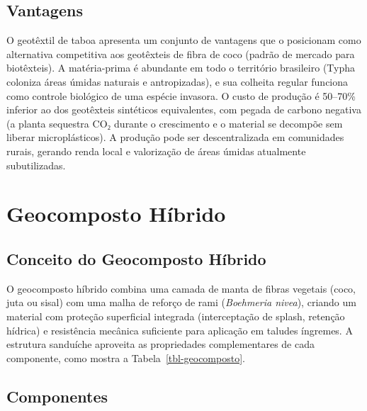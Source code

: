 \documentclass[
  portuguese,
  11pt,
  a4paper,
  open=any]{scrbook}
\begin{document}
\subsection{Vantagens}\label{vantagens}

O geotêxtil de taboa apresenta um conjunto de vantagens que o posicionam
como alternativa competitiva aos geotêxteis de fibra de coco (padrão de
mercado para biotêxteis). A matéria-prima é abundante em todo o
território brasileiro (Typha coloniza áreas úmidas naturais e
antropizadas), e sua colheita regular funciona como controle biológico
de uma espécie invasora. O custo de produção é 50--70\% inferior ao dos
geotêxteis sintéticos equivalentes, com pegada de carbono negativa (a
planta sequestra CO₂ durante o crescimento e o material se decompõe sem
liberar microplásticos). A produção pode ser descentralizada em
comunidades rurais, gerando renda local e valorização de áreas úmidas
atualmente subutilizadas.

\section{Geocomposto Híbrido}\label{geocomposto-huxedbrido}

\subsection{Conceito do Geocomposto
Híbrido}\label{conceito-do-geocomposto-huxedbrido}

O geocomposto híbrido combina uma camada de manta de fibras vegetais
(coco, juta ou sisal) com uma malha de reforço de rami (\emph{Boehmeria
nivea}), criando um material com proteção superficial integrada
(interceptação de splash, retenção hídrica) e resistência mecânica
suficiente para aplicação em taludes íngremes. A estrutura sanduíche
aproveita as propriedades complementares de cada componente, como mostra
a Tabela~\ref{tbl-geocomposto}.

\subsection{Componentes}\label{componentes-1}
\end{document}
